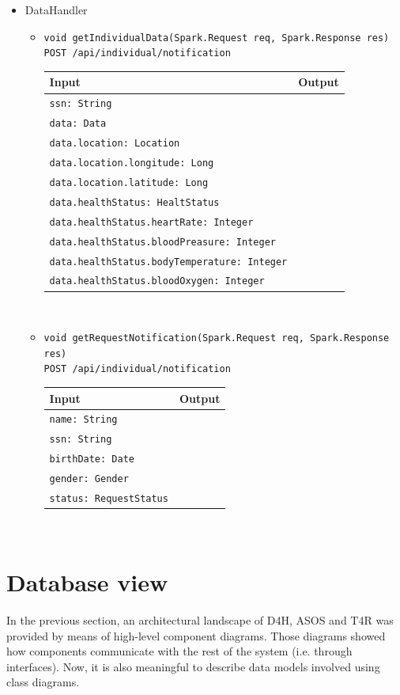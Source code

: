 \documentclass[a4paper, hidelinks, 12pt]{report}
\begin{document}
	\begin{itemize}
		\item{DataHandler}
			\begin{itemize}
				\item{\verb|void getIndividualData(Spark.Request req, Spark.Response res)|\\ \verb|POST /api/individual/notification|}\\
				\begin{tabular}{l | l}
				\textbf{Input} & \textbf{Output} \\
				\hline
					\verb|ssn: String| & \\
					\verb|data: Data| & \\
					\verb|data.location: Location| & \\
					\verb|data.location.longitude: Long| & \\
					\verb|data.location.latitude: Long| & \\
					\verb|data.healthStatus: HealtStatus| & \\
					\verb|data.healthStatus.heartRate: Integer| & \\
					\verb|data.healthStatus.bloodPreasure: Integer| & \\
					\verb|data.healthStatus.bodyTemperature: Integer| & \\
					\verb|data.healthStatus.bloodOxygen: Integer| & \\
				\end{tabular}\\
				\item{\verb|void getRequestNotification(Spark.Request req, Spark.Response res)|\\ \verb|POST /api/individual/notification|}\\
				\begin{tabular}{l | l}
				\textbf{Input} & \textbf{Output} \\
				\hline
					\verb|name: String| & \\
					\verb|ssn: String| & \\
					\verb|birthDate: Date| & \\
					\verb|gender: Gender| & \\
					\verb|status: RequestStatus| & \\
				\end{tabular}\\
			\end{itemize}
	\end{itemize}
	\section{Database view}
In the previous section, an architectural landscape of D4H, ASOS and T4R was provided by means of high-level component diagrams. Those diagrams showed how components communicate with the rest of the system (i.e. through interfaces). Now, it is also meaningful to describe data models involved using class diagrams. 
	
\end{document}

